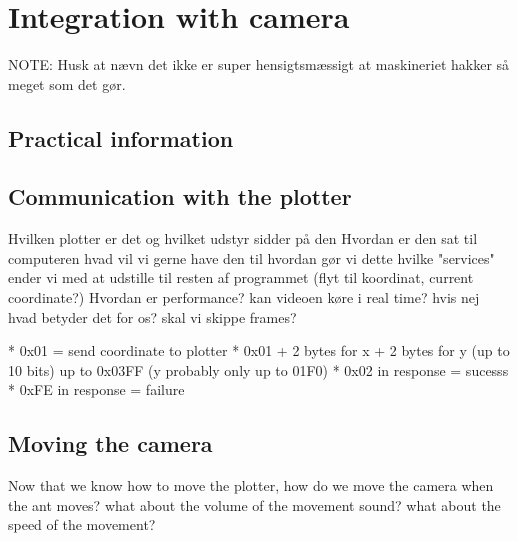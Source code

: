 
\section{Integration with camera}

NOTE: Husk at nævn det ikke er super hensigtsmæssigt at maskineriet hakker så meget som det gør.

\subsection{Practical information}

\subsection{Communication with the plotter}
Hvilken plotter er det og hvilket udstyr sidder på den
Hvordan er den sat til computeren
hvad vil vi gerne have den til
hvordan gør vi dette
hvilke "services" ender vi med at udstille til resten af programmet (flyt til koordinat, current coordinate?)
Hvordan er performance? kan videoen køre i real time? hvis nej hvad betyder det for os? skal vi skippe frames?

*   0x01 = send coordinate to plotter
 *   0x01 + 2 bytes for x + 2 bytes for y (up to 10 bits) up to 0x03FF (y probably only up to 01F0)
 *   0x02 in response = sucesss
 *   0xFE in response = failure
 
\subsection{Moving the camera}
Now that we know how to move the plotter, how do we move the camera when the ant moves?
what about the volume of the movement sound?
what about the speed of the movement?
